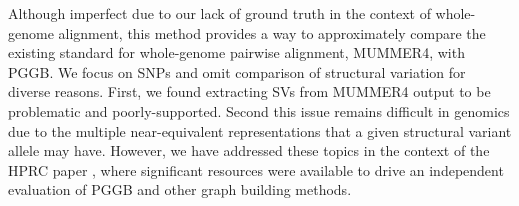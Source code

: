 \documentclass[pdflatex,mathphys]{jnl}%
\theoremstyle{thmstyleone}%
\theoremstyle{thmstyletwo}%
\theoremstyle{thmstylethree}%
\begin{document}
\begin{appendices}
Although imperfect due to our lack of ground truth in the context of whole-genome alignment, this method provides a way to approximately compare the existing standard for whole-genome pairwise alignment, MUMMER4, with PGGB.
We focus on SNPs and omit comparison of structural variation for diverse reasons.
First, we found extracting SVs from MUMMER4 output to be problematic and poorly-supported.
Second this issue remains difficult in genomics due to the multiple near-equivalent representations that a given structural variant allele may have.
However, we have addressed these topics in the context of the HPRC paper \cite{Liao_2023}, where significant resources were available to drive an independent evaluation of PGGB and other graph building methods.






\end{appendices}



\end{document}
